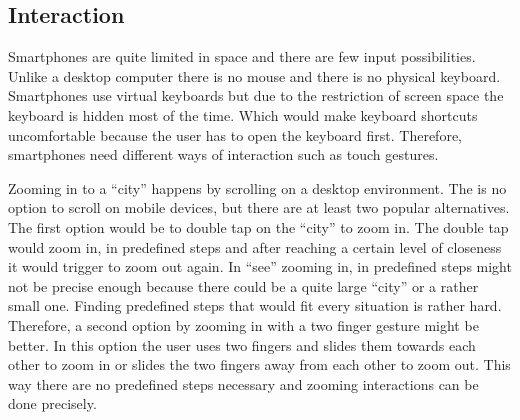 \subsection{Interaction}

Smartphones are quite limited in space and there are few input possibilities.
Unlike a desktop computer there is no mouse and there is no physical keyboard.
Smartphones use virtual keyboards but due to the restriction of screen space the keyboard is hidden most of the time.
Which would make keyboard shortcuts uncomfortable because the user has to open the keyboard first.
Therefore, smartphones need different ways of interaction such as touch gestures. 

Zooming in to a \enquote{\gls{city}} happens by scrolling on a desktop environment. 
The is no option to scroll on mobile devices, but there are at least two popular alternatives.
The first option would be to double tap on the \enquote{\gls{city}} to zoom in.
The double tap would zoom in, in predefined steps and after reaching a certain level of closeness it would trigger to zoom out again.
In \enquote{\gls{see}} zooming in, in predefined steps might not be precise enough because there could be a quite large \enquote{\gls{city}} or a rather small one.
Finding predefined steps that would fit every situation is rather hard.
Therefore, a second option by zooming in with a two finger gesture might be better. 
In this option the user uses two fingers and slides them towards each other to zoom in or slides the two fingers away from each other to zoom out.
This way there are no predefined steps necessary and zooming interactions can be done precisely.
